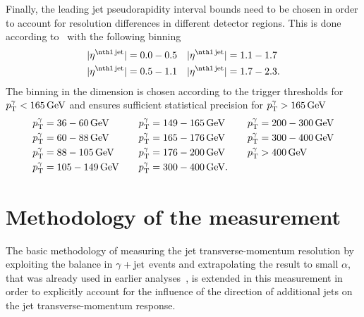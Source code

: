 Finally, the leading jet pseudorapidity interval bounds need to be chosen in order to account for resolution differences in different detector regions.
This is done according to~\cite{bib:Matthias_Thesis} with the following binning
\begin{align*}
|\etafirstjet| &= 0.0-0.5  &&|\etafirstjet| = 1.1-1.7 \\
|\etafirstjet| &= 0.5-1.1  &&|\etafirstjet| = 1.7-2.3.
\end{align*}
The binning in the \ptgamma dimension is chosen according to the trigger thresholds for \mbox{${p}_\mathrm{T}^{\gamma}<165\,\text{Ge}\kern-0.06667em\text{V}$} and ensures sufficient statistical precision for \mbox{${p}_\mathrm{T}^{\gamma}>165\,\text{Ge}\kern-0.06667em\text{V}$}
\begin{align*}
{p}_\mathrm{T}^{\gamma} &= 36 -60\,\text{Ge}\kern-0.06667em\text{V}     &  {p}_\mathrm{T}^{\gamma} &= 149-165\,\text{Ge}\kern-0.06667em\text{V}   & {p}_\mathrm{T}^{\gamma} &= 200-300\,\text{Ge}\kern-0.06667em\text{V}\\
{p}_\mathrm{T}^{\gamma} &= 60 -88\,\text{Ge}\kern-0.06667em\text{V}     &  {p}_\mathrm{T}^{\gamma} &= 165-176\,\text{Ge}\kern-0.06667em\text{V}  & {p}_\mathrm{T}^{\gamma} &= 300-400\,\text{Ge}\kern-0.06667em\text{V}\\
{p}_\mathrm{T}^{\gamma} &= 88 -105\,\text{Ge}\kern-0.06667em\text{V}    &  {p}_\mathrm{T}^{\gamma} &= 176-200\,\text{Ge}\kern-0.06667em\text{V}  & {p}_\mathrm{T}^{\gamma} &> 400\,\text{Ge}\kern-0.06667em\text{V}\\
{p}_\mathrm{T}^{\gamma} &= 105-149\,\text{Ge}\kern-0.06667em\text{V}   \quad &  {p}_\mathrm{T}^{\gamma}  &= 300-400\,\text{Ge}\kern-0.06667em\text{V}. \quad& \\
\end{align*}


\FloatBarrier
\chapter{Methodology of the measurement}
\label{res:ch:methodology}

The basic methodology of measuring the jet transverse-momentum resolution by exploiting the \pt balance in $\gamma + \text{jet}$ events and extrapolating the result to small $\alpha$, that was already used in earlier analyses~\cite{bib:CMS:JERCPaper_2011,CMS:PAS:JETResolution_7TeV}, is extended in this measurement in order to explicitly account for the influence of the direction of additional jets on the jet transverse-momentum response.

